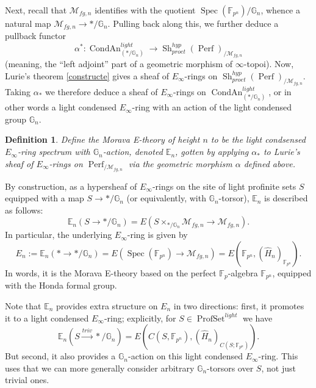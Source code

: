 \documentclass[12pt]{article}
\newtheorem{definition}[theorem]{Definition}
\newcommand{\on}{\operatorname}
\begin{document}
Next, recall that $\mathcal{M}_{fg,n}$ identifies with the quotient $\on{Spec}(\mathbb{F}_{p^n})/\mathbb{G}_n$, whence a natural map $\mathcal{M}_{fg,n} \to \ast/\mathbb{G}_n$.  Pulling back along this, we further deduce a pullback functor
$$\alpha^\ast: \on{CondAn}^{light}_{(\ast/\mathbb{G}_n)} \to \on{Sh}^{hyp}_{proet}(\on{Perf})_{/\mathcal{M}_{fg,n}}$$
(meaning, the ``left adjoint'' part of a geometric morphism of $\infty$-topoi).  Now, Lurie's theorem \ref{constructe} gives a sheaf of $E_\infty$-rings on $\on{Sh}^{hyp}_{proet}(\on{Perf})_{/\mathcal{M}_{fg,n}}$.  Taking $\alpha_\ast$ we therefore deduce a sheaf of $E_\infty$-rings on $\on{CondAn}^{light}_{(\ast/\mathbb{G}_n)}$, or in other words a light condensed $E_\infty$-ring with an action of the light condensed group $\mathbb{G}_n$.


\begin{definition}\label{lighte}
Define \emph{the Morava E-theory of height $n$} to be the light condsensed $E_\infty$-ring spectrum with $\mathbb{G}_n$-action, denoted $\mathbb{E}_n$, gotten by applying $\alpha_\ast$ to Lurie's sheaf of $E_\infty$-rings on $\on{Perf}_{/\mathcal{M}_{fg,n}}$ via the geometric morphism $\alpha$ defined above.
\end{definition}

By construction, as a hypersheaf of $E_\infty$-rings on the site of light profinite sets $S$ equipped with a map $S\to \ast/\mathbb{G}_n$ (or equivalently, with $\mathbb{G}_n$-torsor), $\mathbb{E}_n$ is described as follows:
$$\mathbb{E}_n(S\to\ast/\mathbb{G}_n) = E(S\times_{\ast/\mathbb{G}_n}\mathcal{M}_{fg,n}\to \mathcal{M}_{fg,n}).$$
In particular, the underlying $E_\infty$-ring is given by
$$E_n:=\mathbb{E}_n(\ast\to \ast/\mathbb{G}_n) = E(\on{Spec}(\mathbb{F}_{p^n})\to\mathcal{M}_{fg,n}) = E(\mathbb{F}_{p^n},(\widehat{H}_n)_{\mathbb{F}_{p^n}}).$$
In words, it is the Morava E-theory based on the perfect $\mathbb{F}_p$-algebra $\mathbb{F}_{p^n}$, equipped with the Honda formal group.

Note that $\mathbb{E}_n$ provides extra structure on $E_n$ in two directions: first, it promotes it to a light condensed $E_\infty$-ring; explicitly, for $S\in\on{ProfSet}^{light}$ we have
$$\mathbb{E}_n(S\overset{triv}{\longrightarrow}\ast/\mathbb{G}_n) = E(C(S,\mathbb{F}_{p^n}),(\widehat{H}_n)_{C(S;\mathbb{F}_{p^n})}).$$
But second, it also provides a $\mathbb{G}_n$-action on this light condensed $E_\infty$-ring.  This uses that we can more generally consider arbitrary $\mathbb{G}_n$-torsors over $S$, not just trivial ones.
\end{document}
